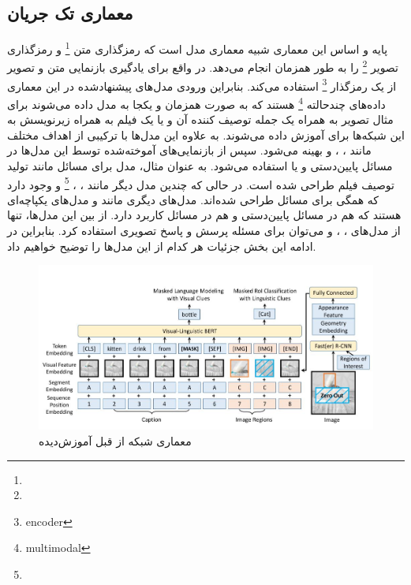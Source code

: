 \subsection[معماری تک جریان]{معماری تک جریان}
	پایه و اساس این معماری شبیه معماری مدل 
	\cite{devlin2018bert}
	است که رمزگذاری متن
	\footnote{}
	و رمزگذاری تصویر 
	\footnote{}
	را به طور همزمان انجام می‌دهد. در واقع برای یادگیری بازنمایی متن و تصویر از یک  رمزگذار
	\footnote{encoder}
	استفاده می‌کند. بنابراین ورودی مدل‌های پیشنهادشده در این معماری داده‌های چندحالته
	\footnote{multimodal}
	هستند که به صورت همزمان و یکجا به مدل داده می‌شوند برای مثال تصویر به همراه یک جمله توصیف کننده آن و یا یک فیلم به همراه زیرنویسش به این شبکه‌ها برای آموزش داده می‌شوند. به علاوه این مدل‌ها با ترکیبی از اهداف مختلف مانند 
	،
	،
	و 
   بهینه می‌شود. سپس از بازنمایی‌های آموخته‌شده توسط این مدل‌ها در مسائل پایین‌دستی 
   و یا 
   استفاده می‌شود. به عنوان مثال، مدل
	\cite{sun2019videobert}
	برای مسائل 
	مانند تولید توصیف فیلم طراحی شده است. در حالی که چندین مدل دیگر مانند
	\cite{alberti2019fusion}
	،
	 \cite{li2020unicoder}
	،
	\footnote{}\cite{su2019vl}
	و
	\cite{chen2020uniter}
	وجود دارد که همگی برای مسائل 
    طراحی شده‌اند. مدل‌های دیگری مانند
	\cite{zhou2020unified}
	و
	 \cite{li2020oscar}
	مدل‌های یکپاچه‌ای هستند که هم در مسائل پایین‌دستی 
	و هم در مسائل
	کاربرد دارد. از بین این مدل‌ها، تنها از مدل‌های
	،
	،
	و
	می‌توان برای مسئله پرسش و پاسخ تصویری استفاده کرد. بنابراین در ادامه این بخش جزئیات هر کدام از این مدل‌ها را توضیح خواهیم داد.
	\begin{figure}
		\centerline{\includegraphics[scale=0.5]{images/VLBERT.JPG}}
		\caption[معماری شبکه از قبل آموزش‌دیده]{معماری شبکه از قبل آموزش‌دیده\cite{su2019vl}}
		\label{fig:VLBERT}
	\end{figure}

